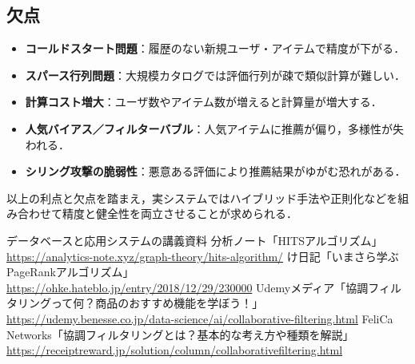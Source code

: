 \documentclass[titlepage,a4paper]{jsarticle}
\begin{document}
\subsection*{欠点}
\begin{itemize}
  \item \textbf{コールドスタート問題}：履歴のない新規ユーザ・アイテムで精度が下がる\cite{cf-udemy}．
  \item \textbf{スパース行列問題}：大規模カタログでは評価行列が疎で類似計算が難しい\cite{cf-udemy}．
  \item \textbf{計算コスト増大}：ユーザ数やアイテム数が増えると計算量が増大する\cite{cf-basic}．
  \item \textbf{人気バイアス／フィルターバブル}：人気アイテムに推薦が偏り，多様性が失われる\cite{cf-basic}．
  \item \textbf{シリング攻撃の脆弱性}：悪意ある評価により推薦結果がゆがむ恐れがある\cite{cf-udemy}．
\end{itemize}

以上の利点と欠点を踏まえ，実システムではハイブリッド手法や正則化などを組み合わせて精度と健全性を両立させることが求められる．

\begin{thebibliography}{99}
 データベースと応用システムの講義資料
 分析ノート「HITSアルゴリズム」\\
\url{https://analytics-note.xyz/graph-theory/hits-algorithm/}
 け日記「いまさら学ぶPageRankアルゴリズム」\\
\url{https://ohke.hateblo.jp/entry/2018/12/29/230000}
 Udemyメディア「協調フィルタリングって何？商品のおすすめ機能を学ぼう！」\\
\url{https://udemy.benesse.co.jp/data-science/ai/collaborative-filtering.html}
 FeliCa Networks「協調フィルタリングとは？基本的な考え方や種類を解説」\\
\url{https://receiptreward.jp/solution/column/collaborativefiltering.html}
\end{thebibliography}
\end{document}
